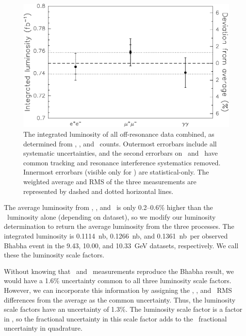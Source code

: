 \documentclass{cornell}
\begin{document}
\begin{figure}[p]
  \begin{center}
    \includegraphics[width=\linewidth]{plots/comparelumis}
  \end{center}
  \caption{\label{comparelumis} The integrated luminosity of all
  off-resonance data combined, as determined from \ee, \mumu, and
  \gamgam\ counts.  Outermost errorbars include all systematic
  uncertainties, and the second errorbars on \ee\ and \mumu\ have
  common tracking and resonance interference systematics removed.
  Innermost errorbars (visible only for \mumu) are statistical-only.
  The weighted average and RMS of the three measurements are
  represented by dashed and dotted horizontal lines.}
\end{figure}

The average luminosity from \ee, \mumu, and \gamgam\ is only
0.2--0.6\% higher than the \ee\ luminosity alone (depending on
dataset), so we modify our luminosity determination to return the
average luminosity from the three processes.  The integrated
luminosity is 0.1114~nb\inv, 0.1266~nb\inv, and 0.1361~nb\inv\ per
observed Bhabha event in the 9.43, 10.00, and 10.33~GeV datasets,
respectively.  We call these the luminosity scale factors.

Without knowing that \mumu\ and \gamgam\ measurements reproduce the
Bhabha result, we would have a 1.6\% uncertainty common to all three
luminosity scale factors.  However, we can incorporate this
information by assigning the \ee, \mumu, and \gamgam\ RMS differences
from the average as the common uncertainty.  Thus, the luminosity
scale factors have an uncertainty of 1.3\%.  \label{sec:luminosity}
The luminosity scale factor is a factor in \geehadtot, so the
fractional uncertainty in this scale factor adds to the \geehadtot\
fractional uncertainty in quadrature.
\end{document}
